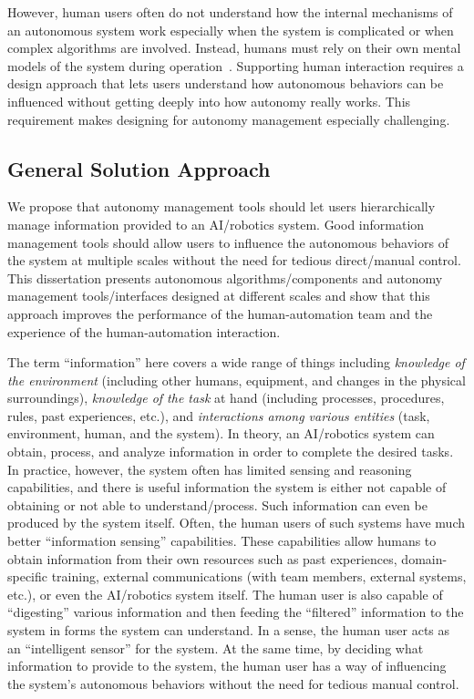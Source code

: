 However, human users often do not understand how the internal mechanisms of an autonomous system work especially when the system is complicated or when complex algorithms are involved. Instead, humans must rely on their own mental models of the system during operation~\cite{Moray1999Mental}. Supporting human interaction requires a design approach that lets users understand how autonomous behaviors can be influenced without getting deeply into how autonomy really works. This requirement makes designing for autonomy management especially challenging.

\subsection{General Solution Approach}

We propose that autonomy management tools should let users hierarchically manage information provided to an AI/robotics system. Good information management tools should allow users to influence the autonomous behaviors of the system at multiple scales without the need for tedious direct/manual control. This dissertation presents autonomous algorithms/components and autonomy management tools/interfaces designed at different scales and show that this approach improves the performance of the human-automation team and the experience of the human-automation interaction.

The term ``information'' here covers a wide range of things including \textit{knowledge of the environment} (including other humans, equipment, and changes in the physical surroundings), \textit{knowledge of the task} at hand (including processes, procedures, rules, past experiences, etc.), and \textit{interactions among various entities} (task, environment, human, and the system). In theory, an AI/robotics system can obtain, process, and analyze information in order to complete the desired tasks. In practice, however, the system often has limited sensing and reasoning capabilities, and there is useful information the system is either not capable of obtaining or not able to understand/process. Such information can even be produced by the system itself. Often, the human users of such systems have much better ``information sensing'' capabilities. These capabilities allow humans to obtain information from their own resources such as past experiences, domain-specific training, external communications (with team members, external systems, etc.), or even the AI/robotics system itself. The human user is also capable of ``digesting'' various information and then feeding the ``filtered'' information to the system in forms the system can understand. In a sense, the human user acts as an ``intelligent sensor'' for the system. At the same time, by deciding what information to provide to the system, the human user has a way of influencing the system's autonomous behaviors without the need for tedious manual control.

